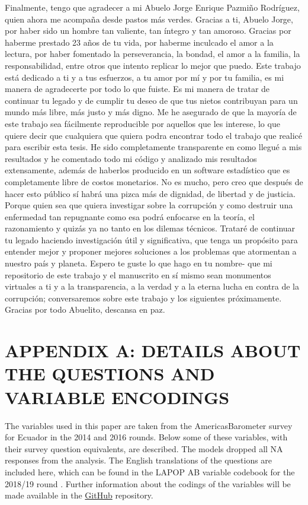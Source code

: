 \documentclass[12pt,a4]{article}\usepackage[]{graphicx}\usepackage[]{xcolor}
\begin{document}
Finalmente, tengo que agradecer a mi Abuelo Jorge Enrique Pazmiño Rodríguez, quien ahora me acompaña desde pastos más verdes. Gracias a ti, Abuelo Jorge, por haber sido un hombre tan valiente, tan íntegro y tan amoroso. Gracias por haberme prestado 23 años de tu vida, por haberme inculcado el amor a la lectura, por haber fomentado la perseverancia, la bondad, el amor a la familia, la responsabilidad, entre otros que intento replicar lo mejor que puedo. Este trabajo está dedicado a ti y a tus esfuerzos, a tu amor por mí y por tu familia, es mi manera de agradecerte por todo lo que fuiste. Es mi manera de tratar de continuar tu legado y de cumplir tu deseo de que tus nietos contribuyan para un mundo más libre, más justo y más digno. Me he asegurado de que la mayoría de este trabajo sea fácilmente reproducible por aquellos que les interese, lo que quiere decir que cualquiera que quiera podra encontrar todo el trabajo que realicé para escribir esta tesis. He sido completamente transparente en como llegué a mis resultados y he comentado todo mi código y analizado mis resultados extensamente, además de haberlos producido en un software estadístico que es completamente libre de costos monetarios. No es mucho, pero creo que después de hacer esto público sí habrá una pizca más de dignidad, de libertad y de justicia. Porque quien sea que quiera investigar sobre la corrupción y como destruir una enfermedad tan repugnante como esa podrá enfocarse en la teoría, el razonamiento y quizás ya no tanto en los dilemas técnicos. Trataré de continuar tu legado haciendo investigación útil y significativa, que tenga un propósito para entender mejor y proponer mejores soluciones a los problemas que atormentan a nuestro país y planeta. Espero te guste lo que hago en tu nombre- que mi repositorio de este trabajo y el manuscrito en sí mismo sean monumentos virtuales a ti y a la transparencia, a la verdad y a la eterna lucha en contra de la corrupción; conversaremos sobre este trabajo y los siguientes próximamente. Gracias por todo Abuelito, descansa en paz. 






\section{APPENDIX A: DETAILS ABOUT THE QUESTIONS AND VARIABLE ENCODINGS}
\label{app:first}

The variables used in this paper are taken from the AmericasBarometer survey for Ecuador in the 2014 and 2016 rounds. Below some of these variables, with their survey question equivalents, are described. The models dropped all NA responses from the analysis. The English translations of the questions are included here, which can be found in the LAPOP AB variable codebook for the 2018/19 round \parencite{LAPOP.2019}. Further information about the codings of the variables will be made available in the \href{https://github.com/dsanchezp18/hbc-v2}{GitHub} repository. 
\end{document}
